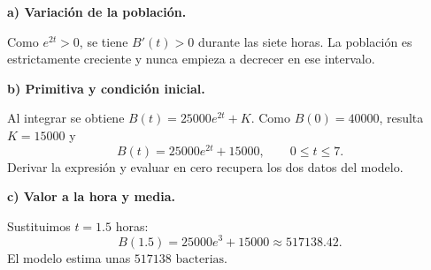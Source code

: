 \textbf{a) Variación de la población.}\par\nopagebreak[4]
Como $e^{2t}>0$, se tiene $B'(t)>0$ durante las siete horas. La población es estrictamente creciente y nunca empieza a decrecer en ese intervalo.

\textbf{b) Primitiva y condición inicial.}\par\nopagebreak[4]
Al integrar se obtiene $B(t)=25000e^{2t}+K$. Como $B(0)=40000$, resulta $K=15000$ y
\[
\boxed{B(t)=25000e^{2t}+15000,\qquad 0\le t\le7.}
\]
Derivar la expresión y evaluar en cero recupera los dos datos del modelo.

\textbf{c) Valor a la hora y media.}\par\nopagebreak[4]
Sustituimos $t=1.5$ horas:
\[
B(1.5)=25000e^3+15000\approx517138.42.
\]
El modelo estima unas $\boxed{517138\text{ bacterias}}$.
